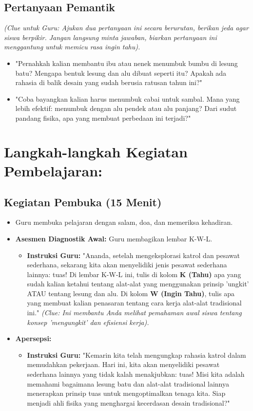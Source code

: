 \documentclass[a4paper,12pt]{article}
\begin{document}
\subsection{Pertanyaan Pemantik}
\textit{(Clue untuk Guru: Ajukan dua pertanyaan ini secara berurutan, berikan jeda agar siswa berpikir. Jangan langsung minta jawaban, biarkan pertanyaan ini menggantung untuk memicu rasa ingin tahu).}

\begin{itemize}
\item "Pernahkah kalian membantu ibu atau nenek menumbuk bumbu di lesung batu? Mengapa bentuk lesung dan alu dibuat seperti itu? Apakah ada rahasia di balik desain yang sudah berusia ratusan tahun ini?"
\item "Coba bayangkan kalian harus menumbuk cabai untuk sambal. Mana yang lebih efektif: menumbuk dengan alu pendek atau alu panjang? Dari sudut pandang fisika, apa yang membuat perbedaan ini terjadi?"
\end{itemize}

\section{Langkah-langkah Kegiatan Pembelajaran:}

\subsection{Kegiatan Pembuka (15 Menit)}
\begin{itemize}
\item Guru membuka pelajaran dengan salam, doa, dan memeriksa kehadiran.
\item \textbf{Asesmen Diagnostik Awal:} Guru membagikan lembar K-W-L.
    \begin{itemize}
    \item \textbf{Instruksi Guru:} "Ananda, setelah mengeksplorasi katrol dan pesawat sederhana, sekarang kita akan menyelidiki jenis pesawat sederhana lainnya: tuas! Di lembar K-W-L ini, tulis di kolom \textbf{K (Tahu)} apa yang sudah kalian ketahui tentang alat-alat yang menggunakan prinsip 'ungkit' ATAU tentang lesung dan alu. Di kolom \textbf{W (Ingin Tahu)}, tulis apa yang membuat kalian penasaran tentang cara kerja alat-alat tradisional ini." \textit{(Clue: Ini membantu Anda melihat pemahaman awal siswa tentang konsep 'mengungkit' dan efisiensi kerja).}
    \end{itemize}
\item \textbf{Apersepsi:}
    \begin{itemize}
    \item \textbf{Instruksi Guru:} "Kemarin kita telah mengungkap rahasia katrol dalam memudahkan pekerjaan. Hari ini, kita akan menyelidiki pesawat sederhana lainnya yang tidak kalah menakjubkan: tuas! Misi kita adalah memahami bagaimana lesung batu dan alat-alat tradisional lainnya menerapkan prinsip tuas untuk mengoptimalkan tenaga kita. Siap menjadi ahli fisika yang menghargai kecerdasan desain tradisional?"
    \end{itemize}
\end{itemize}
\end{document}
